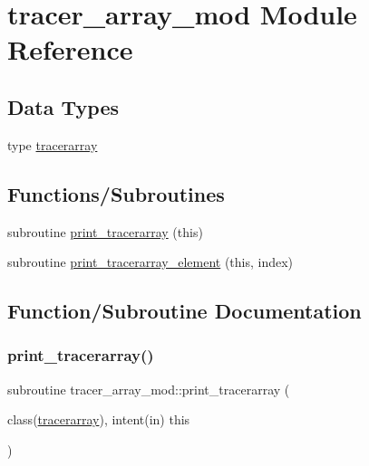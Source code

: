 \hypertarget{namespacetracer__array__mod}{}\section{tracer\+\_\+array\+\_\+mod Module Reference}
\label{namespacetracer__array__mod}
\subsection*{Data Types}
\begin{DoxyCompactItemize}
\item 
type \mbox{\hyperlink{structtracer__array__mod_1_1tracerarray}{tracerarray}}
\end{DoxyCompactItemize}
\subsection*{Functions/\+Subroutines}
\begin{DoxyCompactItemize}
\item 
subroutine \mbox{\hyperlink{namespacetracer__array__mod_a173acbcf343367bf87b705fe5ca0dd29}{print\+\_\+tracerarray}} (this)
\item 
subroutine \mbox{\hyperlink{namespacetracer__array__mod_ac3b3896987e589190c759e92e95e05af}{print\+\_\+tracerarray\+\_\+element}} (this, index)
\end{DoxyCompactItemize}


\subsection{Function/\+Subroutine Documentation}
\mbox{\label{namespacetracer__array__mod_a173acbcf343367bf87b705fe5ca0dd29}} 
\subsubsection{\texorpdfstring{print\+\_\+tracerarray()}{print\_tracerarray()}}
{\footnotesize\ttfamily subroutine tracer\+\_\+array\+\_\+mod\+::print\+\_\+tracerarray (\begin{DoxyParamCaption}\item[{class(\mbox{\hyperlink{structtracer__array__mod_1_1tracerarray}{tracerarray}}), intent(in)}]{this }\end{DoxyParamCaption})\hspace{0.3cm}{\ttfamily [private]}}



